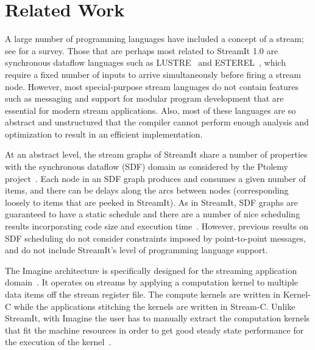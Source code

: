 \vspace{-5pt}
\section{Related Work}
\label{sec:related}
\vspace{-5pt}

A large number  of programming languages have included  a concept of a
stream; see \cite{survey97} for a survey.  Those that are perhaps most
related  to StreamIt 1.0  are synchronous  dataflow languages  such as
LUSTRE~\cite{lustre}  and  ESTEREL~\cite{esterel92},  which require  a
fixed number of inputs to arrive simultaneously before firing a stream
node.  However,  most special-purpose stream languages  do not contain
features such as messaging and support for modular program development
that  are essential  for modern  stream applications.   Also,  most of
these  languages are so  abstract and  unstructured that  the compiler
cannot  perform  enough analysis  and  optimization  to  result in  an
efficient implementation.

At an abstract level, the stream  graphs of StreamIt share a number of
properties with the synchronous dataflow (SDF) domain as considered by
the Ptolemy project~\cite{ptolemyoverview}.  Each node in an SDF graph
produces and consumes a given number of items, and there can be delays
along the arcs between nodes  (corresponding loosely to items that are
peeked in  StreamIt).  As  in StreamIt, SDF  graphs are  guaranteed to
have  a static  schedule and  there are  a number  of  nice scheduling
results  incorporating  code  size and  execution  time~\cite{leesdf}.
However,  previous   results  on   SDF  scheduling  do   not  consider
constraints  imposed by  point-to-point messages,  and do  not include
StreamIt's level of programming language support.

The Imagine  architecture is  specifically designed for  the streaming
application domain~\cite{rixner98bandwidthefficient}.   It operates on
streams by  applying a computation  kernel to multiple data  items off
the stream register file.  The compute kernels are written in Kernel-C
while the applications stitching  the kernels are written in Stream-C.
Unlike StreamIt,  with Imagine  the user has  to manually  extract the
computation kernels  that fit  the machine resources  in order  to get
good   steady   state   performance   for   the   execution   of   the
kernel~\cite{kapasi:2001:ss}.
